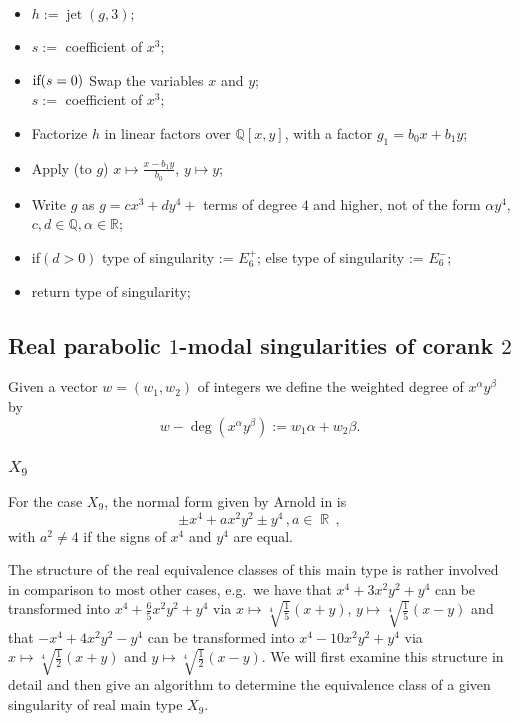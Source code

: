 \documentclass{amsproc}
\DeclareMathOperator{\jt}{jet}
\DeclareMathOperator{\R}{\mathbb{R}}
\begin{document}
\begin{itemize}
\item $h:= \jt(g,3);$
\item $s:=$ coefficient of ${x^3};$
\item $\textnormal{if}(s=0)$\newline
\phantom{}\quad Swap the variables $x$ and $y$;\\
\phantom{}\quad $s:=$ coefficient of ${x^3}$;
\item Factorize $h$ in linear factors over $\mathbb Q[x,y]$, with a factor
$g_1=b_0x+b_1y$;
\item Apply (to $g$) $x\mapsto \frac{x-b_1y}{b_0}$, $y\mapsto y$;
\item Write $g$ as $g=cx^3+d y^4+$ terms of degree $4$
and higher, not of the form $\alpha y^4$, $c,d\in\mathbb Q, \alpha\in\mathbb R$;
\item \textnormal{if}$(d>0)$\newline
\phantom{}\quad type of singularity := $E_6^+$;\newline
\phantom{} else\newline
\phantom{}\quad type of singularity := $E_6^-$;
\item return type of singularity;
\end{itemize}

\subsection{Real parabolic $1$-modal singularities of corank $2$}
Given a vector $w=(w_1,w_2)$ of integers we define the weighted degree of $x^\alpha y^\beta$ by \[w-\deg(x^\alpha y^\beta):=w_1\alpha+w_2\beta.\] 

\subsubsection{$X_9$}
For the case $X_9$, the normal form given by Arnold in \cite{AVG1985} is
\[
\pm x^4 +a x^2 y^2 \pm y^4 \,, a \in \R \,,
\]
with $a^2 \neq 4$ if the signs of $x^4$ and $y^4$ are equal.

The structure of the real equivalence classes of this main type is rather
involved in comparison to most other cases, e.g.~we have that
$x^4 +3 x^2 y^2 +y^4$ can be transformed into $x^4+\frac{6}{5} x^2 y^2 +y^4$
via $x \mapsto \sqrt[4]{\frac{1}{5}}(x+y)$,
$y \mapsto \sqrt[4]{\frac{1}{5}}(x-y)$ and that $-x^4 +4x^2 y^2 -y^4$ can be
transformed into $x^4 -10 x^2 y^2 +y^4$ via
$x \mapsto \sqrt[4]{\frac{1}{2}}(x+y)$ and
$y \mapsto \sqrt[4]{\frac{1}{2}}(x-y)$. We will first examine this structure in
detail and then give an algorithm to determine the equivalence class of a given
singularity of real main type $X_9$.
\end{document}
